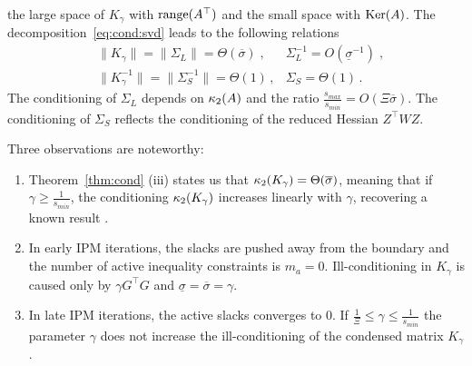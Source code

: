 the large space of $K_\gamma$ with $\operatorname{range}(A^\top)$
and the small space with $\operatorname{Ker}(A)$.
The decomposition~\eqref{eq:cond:svd} leads to the following relations
\begin{equation}
  \label{eq:cond:boundinvariantsubspace}
  \begin{aligned}
    & \| K_\gamma \| = \| \Sigma_L \| = \Theta(\overline{\sigma}) \; , &
    \Sigma_L^{-1} = O(\underline{\sigma}^{-1})  \;, \\
    & \| K_\gamma^{-1} \| = \| \Sigma_S^{-1} \| = \Theta(1) \, , &
  \Sigma_S = \Theta(1) \, .
  \end{aligned}
\end{equation}
The conditioning of $\Sigma_L$ depends on $\kappa_2(A)$
and the ratio $\frac{s_{max}}{s_{min}} = O(\Xi \overline{\sigma})$.
The conditioning of $\Sigma_S$ reflects the conditioning of the reduced Hessian $Z^\top W Z$.

Three observations are noteworthy:
\begin{enumerate}
  \item Theorem~\ref{thm:cond} (iii) states us that $\kappa_2(K_\gamma) = \Theta(\overline{\sigma})$,
    meaning that if $\gamma \geq \frac{1}{s_{min}}$,
    the conditioning $\kappa_2(K_\gamma)$ increases linearly with $\gamma$,
    recovering a known result \cite{regev2023hykkt}.
  \item In early IPM iterations, the slacks are pushed away from the boundary
    and the number of active inequality constraints is $m_a = 0$. Ill-conditioning
    in $K_\gamma$ is caused only by $\gamma G^\top G$ and $\underline{\sigma} = \overline{\sigma} = \gamma$.
  \item In late IPM iterations, the active slacks converges to $0$.
    If $\frac{1}{\Xi} \leq \gamma \leq \frac{1}{s_{min}}$ the parameter $\gamma$
    does not increase the ill-conditioning of the condensed matrix $K_\gamma$.
\end{enumerate}

